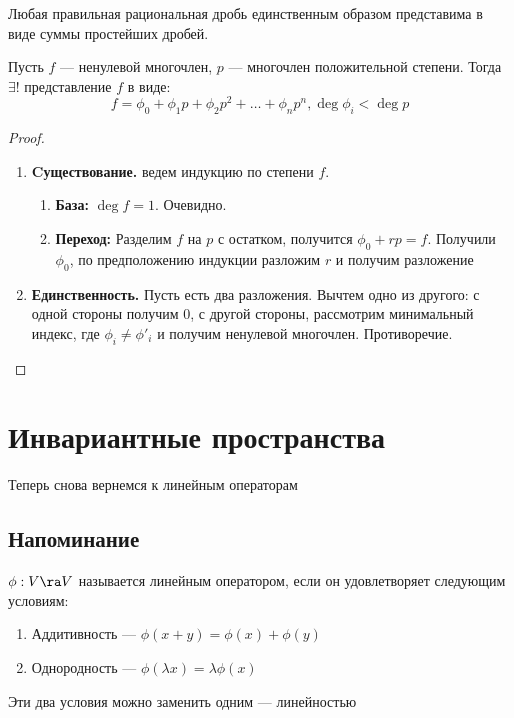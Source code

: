 \begin{corollary}
    Любая правильная рациональная дробь единственным образом представима в виде суммы простейших дробей.
\end{corollary}

\begin{theorem}
    Пусть \(f\) --- ненулевой многочлен, \(p\) --- многочлен положительной степени. Тогда \(\exists!\) представление \(f\) в виде:
    \[f = \phi_0 + \phi_1p + \phi_2p^2 + \dots + \phi_np^n, \deg\phi_i < \deg p\]
\end{theorem}
\begin{proof}\indent
    \begin{enumerate}
        \item[] \textbf{Cуществование.} ведем индукцию по степени \(f\).
        \begin{enumerate}
            \item[] \textbf{База:} \(\deg f = 1\). Очевидно.
            \item[] \textbf{Переход:} Разделим \(f\) на \(p\) с остатком, получится \(\phi_0 + rp = f\). Получили \(\phi_0\), по предположению индукции разложим \(r\) и получим разложение
        \end{enumerate}
        \item[] \textbf{Единственность.} Пусть есть два разложения. Вычтем одно из другого: с одной стороны получим 0, с другой стороны, рассмотрим минимальный индекс, где \(\phi_i \ne \phi'_i\) и получим ненулевой многочлен. Противоречие.
    \end{enumerate}
\end{proof}

\section{Инвариантные пространства}
Теперь снова вернемся к линейным операторам
\subsection{Напоминание}

\begin{definition}
    \(\phi: V \ra V\) называется линейным оператором, если он удовлетворяет следующим условиям:
    \begin{enumerate}
        \item Аддитивность --- \(\phi(x + y) = \phi(x) + \phi(y)\)
        \item Однородность --- \(\phi(\lambda x) = \lambda\phi(x)\)
    \end{enumerate}
    Эти два условия можно заменить одним --- линейностью
\end{definition}

